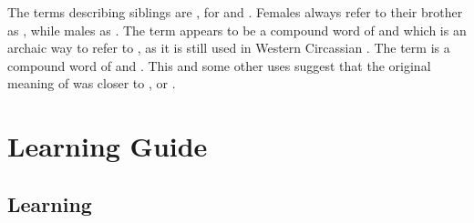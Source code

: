\documentclass[a4paper, 10pt]{book}
\begin{document}
The terms describing siblings are ,  for  and . Females always refer to their brother as , while males as .
The term  appears to be a compound word of  and  which is an archaic way to refer to , as it is still used in Western Circassian . The term  is a compound word of   and  . This and some other uses suggest that the original meaning of  was closer to ,  or .


\part{Learning Guide}
\chapter{Learning}
\end{document}
